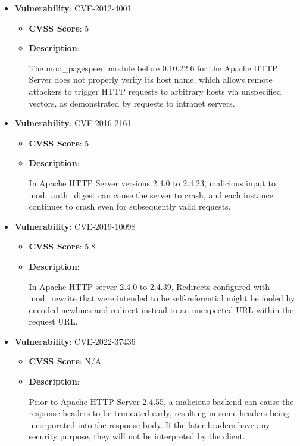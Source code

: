 \documentclass{article}
\begin{document}
\begin{itemize}
        \item \textbf{Vulnerability}: CVE-2012-4001
        \begin{itemize}
            \item \textbf{CVSS Score}:  5 
            \item \textbf{Description}:
            \parbox[t]{0.9\linewidth}{
                \ttfamily The mod\_pagespeed module before 0.10.22.6 for the Apache HTTP Server does not properly verify its host name, which allows remote attackers to trigger HTTP requests to arbitrary hosts via unspecified vectors, as demonstrated by requests to intranet servers.
            }
        \end{itemize}
    
        \item \textbf{Vulnerability}: CVE-2016-2161
        \begin{itemize}
            \item \textbf{CVSS Score}:  5 
            \item \textbf{Description}:
            \parbox[t]{0.9\linewidth}{
                \ttfamily In Apache HTTP Server versions 2.4.0 to 2.4.23, malicious input to mod\_auth\_digest can cause the server to crash, and each instance continues to crash even for subsequently valid requests.
            }
        \end{itemize}
    
        \item \textbf{Vulnerability}: CVE-2019-10098
        \begin{itemize}
            \item \textbf{CVSS Score}:  5.8 
            \item \textbf{Description}:
            \parbox[t]{0.9\linewidth}{
                \ttfamily In Apache HTTP server 2.4.0 to 2.4.39, Redirects configured with mod\_rewrite that were intended to be self-referential might be fooled by encoded newlines and redirect instead to an unexpected URL within the request URL.
            }
        \end{itemize}
    
        \item \textbf{Vulnerability}: CVE-2022-37436
        \begin{itemize}
            \item \textbf{CVSS Score}:  N/A 
            \item \textbf{Description}:
            \parbox[t]{0.9\linewidth}{
                \ttfamily Prior to Apache HTTP Server 2.4.55, a malicious backend can cause the response headers to be truncated early, resulting in some headers being incorporated into the response body. If the later headers have any security purpose, they will not be interpreted by the client.
            }
        \end{itemize}
    

\end{itemize}
\end{document}
